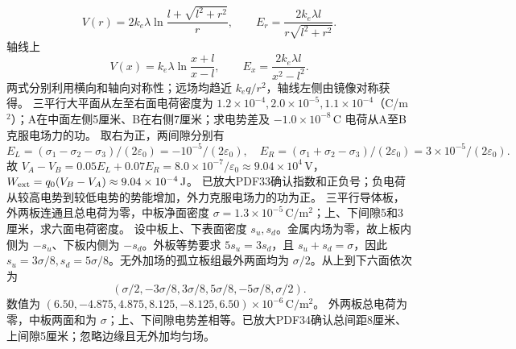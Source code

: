 \[
V(r)=2k_e\lambda\ln\frac{l+\sqrt{l^2+r^2}}{r},\qquad
E_r=\frac{2k_e\lambda l}{r\sqrt{l^2+r^2}}.
\]
轴线上
\[
V(x)=k_e\lambda\ln\frac{x+l}{x-l},\qquad
E_x=\frac{2k_e\lambda l}{x^2-l^2}.
\]
\crosscheck 两式分别利用横向和轴向对称性；远场均趋近 $k_eq/r^2$，轴线左侧由镜像对称获得。
\problemtext 三平行大平面从左至右面电荷密度为 $1.2\times10^{-4},2.0\times10^{-5},1.1\times10^{-4}$（C/m$^2$）；A在中面左侧5厘米、B在右侧7厘米；求电势差及 $-1.0\times10^{-8}\,\mathrm C$ 电荷从A至B克服电场力的功。
\workings 取右为正，两间隙分别有
\[
E_L=(\sigma_1-\sigma_2-\sigma_3)/(2\varepsilon_0)=-10^{-5}/(2\varepsilon_0),
\quad E_R=(\sigma_1+\sigma_2-\sigma_3)/(2\varepsilon_0)=3\times10^{-5}/(2\varepsilon_0).
\]
故 $V_A-V_B=0.05E_L+0.07E_R=8.0\times10^{-7}/\varepsilon_0\approx9.04\times10^4\,\mathrm V$，$W_{\rm ext}=q_0(V_B-V_A)\approx9.04\times10^{-4}\,\mathrm J$。
\crosscheck 已放大PDF33确认指数和正负号；负电荷从较高电势到较低电势的势能增加，外力克服电场力的功为正。
\problemtext 三平行导体板，外两板连通且总电荷为零，中板净面密度 $\sigma=1.3\times10^{-5}\,\mathrm{C/m^2}$；上、下间隙5和3厘米，求六面电荷密度。
\workings 设中板上、下表面密度 $s_u,s_d$。金属内场为零，故上板内侧为 $-s_u$、下板内侧为 $-s_d$。外板等势要求 $5s_u=3s_d$，且 $s_u+s_d=\sigma$，因此 $s_u=3\sigma/8,s_d=5\sigma/8$。无外加场的孤立板组最外两面均为 $\sigma/2$。从上到下六面依次为
\[
(\sigma/2,-3\sigma/8,3\sigma/8,5\sigma/8,-5\sigma/8,\sigma/2).
\]
数值为 $(6.50,-4.875,4.875,8.125,-8.125,6.50)\times10^{-6}\,\mathrm{C/m^2}$。
\crosscheck 外两板总电荷为零，中板两面和为 $\sigma$；上、下间隙电势差相等。已放大PDF34确认总间距8厘米、上间隙5厘米；忽略边缘且无外加均匀场。

